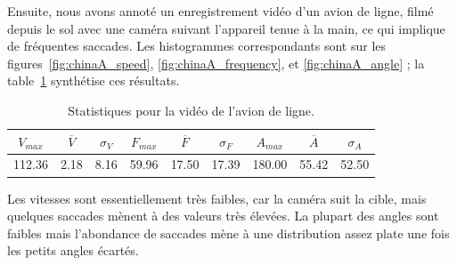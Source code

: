 	Ensuite, nous avons annoté un enregistrement vidéo d'un avion de ligne, filmé depuis le sol avec une caméra suivant l'appareil tenue à la main, ce qui implique de fréquentes saccades. Les histogrammes correspondants sont sur les figures~\ref{fig:chinaA_speed}, \ref{fig:chinaA_frequency}, et \ref{fig:chinaA_angle} ; la table~\ref{tab:chinaA_stats} synthétise ces résultats.

\begin{table}
	\centering
	\begin{tabular}{c c c c c c c c c}
		$V_{max}$	& $\overline{V}$	& $\sigma_{V}$	& $F_{max}$	& $\overline{F}$	& $\sigma_{F}$	& $A_{max}$	& $\overline{A}$	& $\sigma_{A}$	\bigstrut[b] \\ \hline

		112.36		& 2.18				& 8.16			& 59.96		& 17.50				& 17.39			& 180.00	& 55.42				& 52.50			\bigstrut[t] \\
	\end{tabular}
	\caption[Statistiques pour de l'avion de ligne]{Statistiques pour la vidéo de l'avion de ligne.}
	\label{tab:chinaA_stats}
\end{table}
	
	Les vitesses sont essentiellement très faibles, car la caméra suit la cible, mais quelques saccades mènent à des valeurs très élevées. La plupart des angles sont faibles mais l'abondance de saccades mène à une distribution assez \og plate \fg{} une fois les petits angles écartés.

